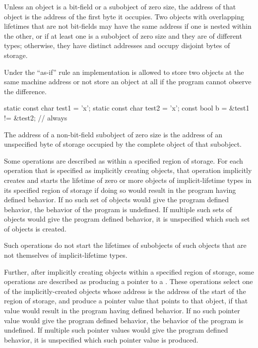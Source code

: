 \pnum
{}%
%
Unless an object is a bit-field or a subobject of zero size, the
address of that object is the address of the first byte it occupies.
Two objects
with overlapping lifetimes
that are not bit-fields
may have the same address
if one is nested within the other,
or
if at least one is a subobject of zero size
and they are of different types;
otherwise, they have distinct addresses
and occupy disjoint bytes of storage.
\begin{footnote}
Under the ``as-if'' rule an
implementation is allowed to store two objects at the same machine address or
not store an object at all if the program cannot observe the
difference.
\end{footnote}
\begin{example}
\begin{codeblock}
static const char test1 = 'x';
static const char test2 = 'x';
const bool b = &test1 != &test2;        // always 
\end{codeblock}
\end{example}
The address of a non-bit-field subobject of zero size is
the address of an unspecified byte of storage
occupied by the complete object of that subobject.

\pnum
Some operations are described as
within a specified region of storage.
For each operation that is specified as implicitly creating objects,
that operation implicitly creates and starts the lifetime of
zero or more objects of implicit-lifetime types
in its specified region of storage
if doing so would result in the program having defined behavior.
If no such set of objects would give the program defined behavior,
the behavior of the program is undefined.
If multiple such sets of objects would give the program defined behavior,
it is unspecified which such set of objects is created.
\begin{note}
Such operations do not start the lifetimes of subobjects of such objects
that are not themselves of implicit-lifetime types.
\end{note}

\pnum
Further, after implicitly creating objects within a specified region of storage,
some operations are described as producing a pointer to a
.
These operations select one of the implicitly-created objects
whose address is the address of the start of the region of storage,
and produce a pointer value that points to that object,
if that value would result in the program having defined behavior.
If no such pointer value would give the program defined behavior,
the behavior of the program is undefined.
If multiple such pointer values would give the program defined behavior,
it is unspecified which such pointer value is produced.

